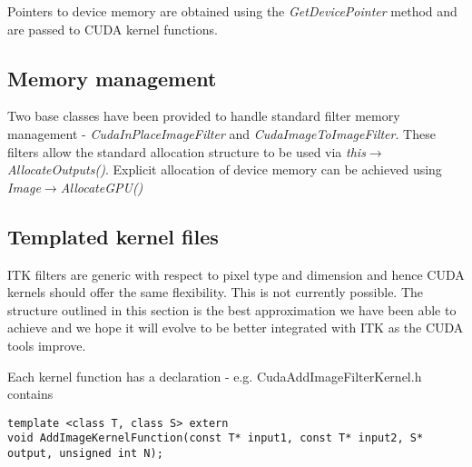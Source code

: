 \documentclass{InsightArticle}
\begin{document}
Pointers to device memory are obtained using the {\em
  GetDevicePointer} method and are passed to CUDA kernel functions.

\subsection{Memory management}
Two base classes have been provided to handle standard filter memory
management - {\em CudaInPlaceImageFilter} and {\em
CudaImageToImageFilter}. These filters allow the standard allocation
structure to be used via {\em this$\rightarrow$AllocateOutputs()}. Explicit
allocation of device memory can be achieved using
{\em Image$\rightarrow$AllocateGPU()}

\subsection{Templated kernel files}
ITK filters are generic with respect to pixel type and dimension and
hence CUDA kernels should offer the same flexibility. This is not
currently possible. The structure outlined in this section is the best
approximation we have been able to achieve and we hope it will evolve
to be better integrated with ITK as the CUDA tools improve.

Each kernel function has a declaration - e.g. CudaAddImageFilterKernel.h contains
\begin{verbatim}
template <class T, class S> extern
void AddImageKernelFunction(const T* input1, const T* input2, S* output, unsigned int N);
\end{verbatim}
\end{document}

